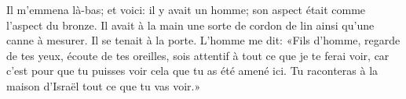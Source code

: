 Il m’emmena là-bas; et voici: il y avait un homme;
	son aspect était comme l’aspect du bronze.
Il avait à la main une sorte de cordon de lin ainsi qu’une canne à mesurer.
	Il se tenait à la porte.
L’homme me dit: «Fils d’homme, regarde de tes yeux, écoute de tes oreilles,
	sois attentif à tout ce que je te ferai voir,
	car c’est pour que tu puisses voir cela que tu as été amené ici.
Tu raconteras à la maison d’Israël tout ce que tu vas voir.»
